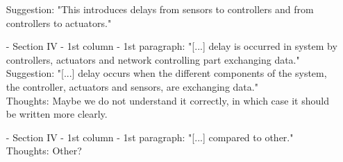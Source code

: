 \begin{itemize}
Suggestion: "This introduces delays from sensors to controllers and from controllers to actuators."\\
\item[-]Section IV - 1st column - 1st paragraph: "[...] delay is occurred in system by controllers, actuators and network controlling part exchanging data."\\
Suggestion: "[...] delay occurs when the different components of the system, the controller, actuators and sensors, are exchanging data."\\
Thoughts: Maybe we do not understand it correctly, in which case it should be written more clearly.\\
\item[-]Section IV - 1st column - 1st paragraph: "[...] compared to other."\\
Thoughts: Other?
\end{itemize}
